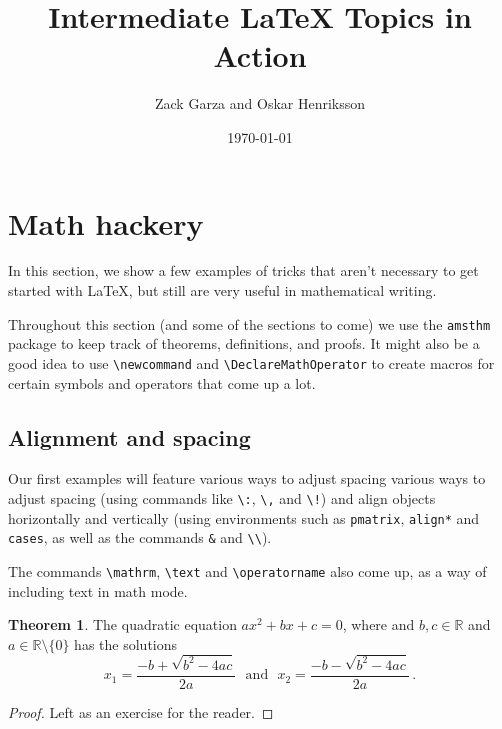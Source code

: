\documentclass[11pt,letterpaper,titlepage]{article}
\title{\vspace{-2in} \huge Intermediate {\LaTeX} Topics in Action}
\author{\Large Zack Garza and Oskar Henriksson}
\date{\Large \today}
\numberwithin{equation}{section}
\numberwithin{figure}{section}
\numberwithin{table}{section}
\numberwithin{algorithm}{section}
\theoremstyle{definition}
\newtheorem{theorem}{Theorem}[section] %
\begin{document}
\maketitle
\thispagestyle{empty} %
\tableofcontents
\newpage
\setcounter{page}{1} %

\section{Math hackery}
In this section, we show a few examples of tricks that aren't necessary to get started with \LaTeX, but still are very useful in mathematical writing. 

Throughout this section (and some of the sections to come) we use the \verb$amsthm$ package to keep track of theorems, definitions, and proofs. It might also be a good idea to use \verb$\newcommand$ and \verb$\DeclareMathOperator$ to create macros for certain symbols and operators that come up a lot.

\subsection{Alignment and spacing}
\label{su:alignment}
Our first examples will feature various ways to adjust spacing various ways to adjust spacing (using commands like \verb$\:$, \verb$\,$ and \verb$\!$) and align objects horizontally and vertically (using environments such as {\verb$pmatrix$}, {\verb$align*$} and {\verb$cases$}, as well as the commands {\verb$&$} and \verb$\\$). 

The commands \verb$\mathrm$, \verb$\text$ and \verb$\operatorname$ also come up, as a way of including text in math mode.

\begin{theorem}
    The quadratic equation $ax^2+bx+c=0$, where and $b,c\in\mathbb{R}$ and $a\in\mathbb{R}\setminus \{0\}$ has the solutions
    \[
    x_1 = \frac{-b+\sqrt{b^2-4ac}}{2a}
    \:\:\:\text{and}\:\:\:
    x_2 = \frac{-b-\sqrt{b^2-4ac}}{2a}\,.
    \]
\end{theorem}

\begin{proof}
Left as an exercise for the reader.
\end{proof}
\end{document}
